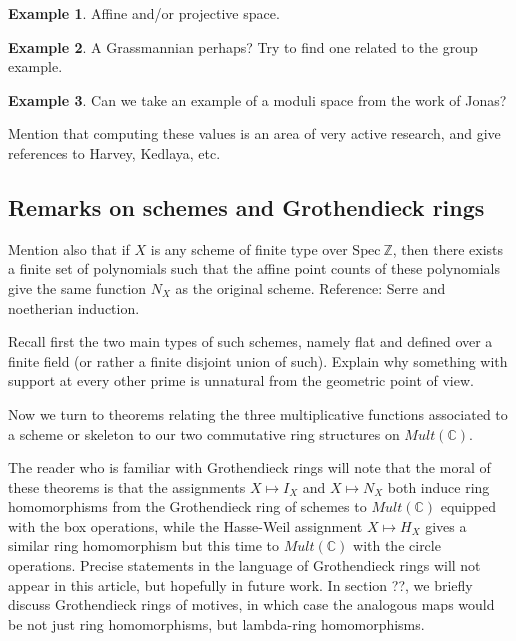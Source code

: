 \documentclass[a4paper]{article}
\theoremstyle{definition}
\newtheorem{example}{Example}[section]
\theoremstyle{remark}
\newcommand{\Z}{\mathbb{Z}}
\newcommand{\C}{\mathbb{C}}
\newcommand{\Spec}{\mathrm{Spec}}
\begin{document}
\begin{example}
Affine and/or projective space.

\end{example}


\begin{example}
A Grassmannian perhaps? Try to find one related to the group example. 

\end{example}


\begin{example}
Can we take an example of a moduli space from the work of Jonas?

\end{example}


Mention that computing these values is an area of very active research, and give references to Harvey, Kedlaya, etc. 



\subsection{Remarks on schemes and Grothendieck rings}

Mention also that if $X$ is any scheme of finite type over $\Spec \ \Z$, then there exists a finite set of polynomials such that the affine point counts of these polynomials give the same function $N_X$ as the original scheme. Reference: Serre and noetherian induction.

Recall first the two main types of such schemes, namely flat and defined over a finite field (or rather a finite disjoint union of such). Explain why something with support at every other prime is unnatural from the geometric point of view.


Now we turn to theorems relating the three multiplicative functions associated to a scheme or skeleton to our two commutative ring structures on $Mult(\C)$. 

The reader who is familiar with Grothendieck rings will note that the moral of these theorems is that the assignments $X \mapsto I_X$ and $X \mapsto N_X$ both induce ring homomorphisms from the Grothendieck ring of schemes to $Mult(\C)$ equipped with the box operations, while the Hasse-Weil assignment $X \mapsto H_X$ gives a similar ring homomorphism but this time to $Mult(\C)$ with the circle operations. Precise statements in the language of Grothendieck rings will not appear in this article, but hopefully in future work. In section ??, we briefly discuss Grothendieck rings of motives, in which case the analogous maps would be not just ring homomorphisms, but lambda-ring homomorphisms.
\end{document}
